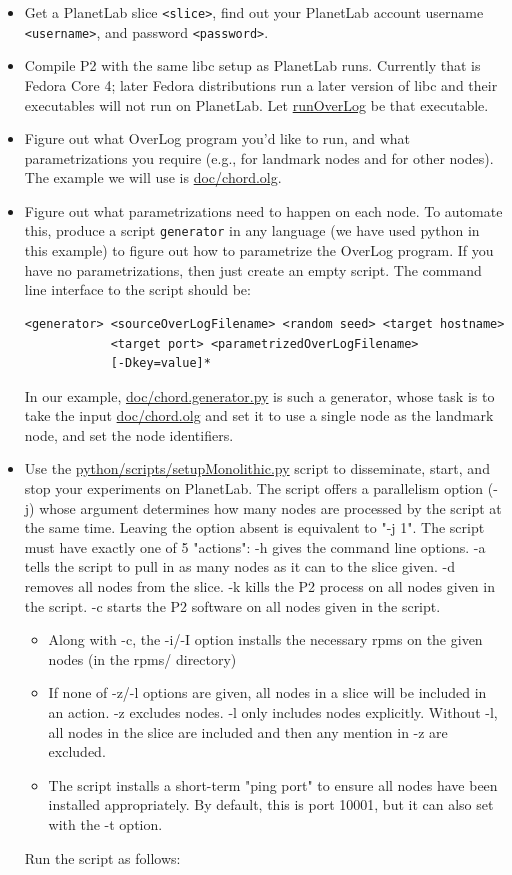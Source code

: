 \documentclass{article}
\begin{document}
\begin{itemize}
\item Get a PlanetLab slice \texttt{<slice>}, find out your PlanetLab account
username \texttt{<username>}, and password \texttt{<password>}.
\item Compile P2 with the same libc setup as PlanetLab runs.  Currently
that is Fedora Core 4; later Fedora distributions run a later version of libc and
their executables will not run on PlanetLab.  Let \url{runOverLog} be that
executable. 
\item Figure out what OverLog program you'd like to run, and what
parametrizations you require (e.g., for landmark nodes and for other
nodes).  The example we will use is \url{doc/chord.olg}.
\item Figure out what parametrizations need to happen on each node.  To
automate this, produce a script \texttt{generator} in any language (we have
used python in this example) to figure out how to parametrize the
OverLog program. If you have no parametrizations, then just create an
empty script.  The command line interface to the script should be:
\begin{verbatim}
<generator> <sourceOverLogFilename> <random seed> <target hostname>
            <target port> <parametrizedOverLogFilename>
            [-Dkey=value]*
\end{verbatim}
In our example, \url{doc/chord.generator.py} is such a generator, whose task
is to take the input \url{doc/chord.olg} and set it to use a single node as
the landmark node, and set the node identifiers.
\item Use the \url{python/scripts/setupMonolithic.py} script to disseminate,
start, and stop your experiments on PlanetLab.  The script offers a
parallelism option (-j) whose argument determines how many nodes are
processed by the script at the same time. Leaving the option absent is
equivalent to "-j 1".  The script must have exactly one of 5 "actions":
-h gives the command line options. -a tells the script to pull in as
many nodes as it can to the slice given. -d removes all nodes from the
slice. -k kills the P2 process on all nodes given in the script.  -c
starts the P2 software on all nodes given in the script.
\begin{itemize}
\item Along with -c, the -i/-I option installs the necessary rpms on the
     given nodes (in the rpms/ directory)
\item If none of -z/-l options are given, all nodes in a slice will be
     included in an action.  -z excludes nodes.  -l only includes nodes
     explicitly.  Without -l, all nodes in the slice are included and
     then any mention in -z are excluded.
\item The script installs a short-term "ping port" to ensure all nodes
     have been installed appropriately.  By default, this is port 10001,
     but it can also set with the -t option.
\end{itemize}
Run the script as follows:


\end{itemize}
\end{document}
